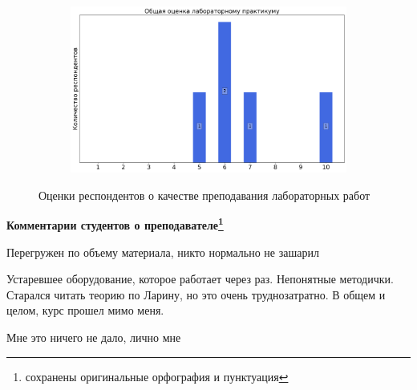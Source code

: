 \begin{figure}[H]
\begin{subfigure}[b]{0.45\textwidth}
			\end{subfigure}
			\begin{subfigure}[b]{0.45\textwidth}
				\centering
				\includegraphics[width=\textwidth]{images/3 course/Аналоговая электроника/labniks-marks-Тужилкин В.А.-3.png}
			\end{subfigure}	
			\caption{Оценки респондентов о качестве преподавания лабораторных работ}
		\end{figure}

		\textbf{Комментарии студентов о преподавателе\protect\footnote{сохранены оригинальные орфография и пунктуация}}
            \begin{commentbox} 
                Перегружен по объему материала, никто нормально не зашарил 
            \end{commentbox} 

            \begin{commentbox} 
                Устаревшее оборудование, которое работает через раз. Непонятные методички. Старался читать теорию по Ларину, но это очень труднозатратно. В общем и целом, курс прошел мимо меня. 
            \end{commentbox} 

            \begin{commentbox} 
                Мне это ничего не дало, лично мне 
            \end{commentbox} 


